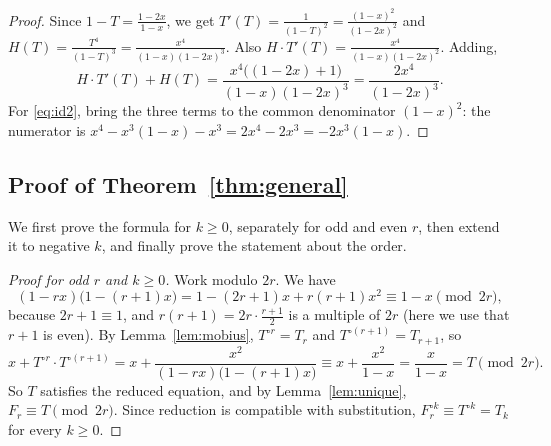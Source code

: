 \documentclass[11pt,a4paper]{article}
\theoremstyle{definition}
\theoremstyle{remark}
\begin{document}
\begin{proof}
Since $1-T=\frac{1-2x}{1-x}$, we get $T'(T)=\frac{1}{(1-T)^2}=\frac{(1-x)^2}{(1-2x)^2}$ and
$H(T)=\frac{T^4}{(1-T)^3}=\frac{x^4}{(1-x)(1-2x)^3}$. Also $H\cdot T'(T)=\frac{x^4}{(1-x)(1-2x)^2}$. Adding,
\[
H\cdot T'(T)+H(T)=\frac{x^4\bigl((1-2x)+1\bigr)}{(1-x)(1-2x)^3}=\frac{2x^4}{(1-2x)^3}.
\]
For \eqref{eq:id2}, bring the three terms to the common denominator $(1-x)^2$: the numerator is
$x^4-x^3(1-x)-x^3=2x^4-2x^3=-2x^3(1-x)$.
\end{proof}

\subsection{Proof of Theorem~\ref{thm:general}}

We first prove the formula for $k\ge0$, separately for odd and even $r$, then extend it to negative $k$, and finally
prove the statement about the order.

\begin{proof}[Proof for odd $r$ and $k\ge0$]
Work modulo $2r$. We have
\[
(1-rx)\bigl(1-(r+1)x\bigr)=1-(2r+1)x+r(r+1)x^2\equiv1-x\pmod{2r},
\]
because $2r+1\equiv1$, and $r(r+1)=2r\cdot\frac{r+1}{2}$ is a multiple of $2r$ (here we use that $r+1$ is even). By
Lemma~\ref{lem:mobius}, $T^{\circ r}=T_r$ and $T^{\circ(r+1)}=T_{r+1}$, so
\[
x+T^{\circ r}\cdot T^{\circ(r+1)}=x+\frac{x^2}{(1-rx)\bigl(1-(r+1)x\bigr)}\equiv x+\frac{x^2}{1-x}=\frac{x}{1-x}=T\pmod{2r}.
\]
So $T$ satisfies the reduced equation, and by Lemma~\ref{lem:unique}, $F_r\equiv T\pmod{2r}$. Since reduction is
compatible with substitution, $F_r^{\circ k}\equiv T^{\circ k}=T_k$ for every $k\ge0$.
\end{proof}
\end{document}
